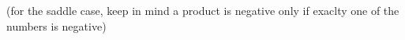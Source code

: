







(for the saddle case, keep in mind a product is negative only
if exaclty one of the numbers is negative)

